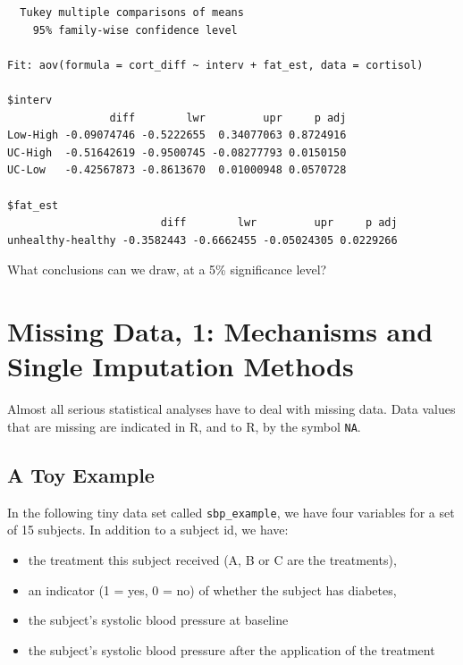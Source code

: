 \documentclass[]{book}
\providecommand{\tightlist}{%
  \setlength{\itemsep}{0pt}\setlength{\parskip}{0pt}}
\theoremstyle{definition}
\theoremstyle{definition}
\theoremstyle{definition}
\theoremstyle{remark}
\begin{document}
\begin{verbatim}
  Tukey multiple comparisons of means
    95% family-wise confidence level

Fit: aov(formula = cort_diff ~ interv + fat_est, data = cortisol)

$interv
                diff        lwr         upr     p adj
Low-High -0.09074746 -0.5222655  0.34077063 0.8724916
UC-High  -0.51642619 -0.9500745 -0.08277793 0.0150150
UC-Low   -0.42567873 -0.8613670  0.01000948 0.0570728

$fat_est
                        diff        lwr         upr     p adj
unhealthy-healthy -0.3582443 -0.6662455 -0.05024305 0.0229266
\end{verbatim}

What conclusions can we draw, at a 5\% significance level?

\chapter{Missing Data, 1: Mechanisms and Single Imputation
Methods}\label{missing-data-1-mechanisms-and-single-imputation-methods}

Almost all serious statistical analyses have to deal with missing data.
Data values that are missing are indicated in R, and to R, by the symbol
\texttt{NA}.

\section{A Toy Example}\label{a-toy-example}

In the following tiny data set called \texttt{sbp\_example}, we have
four variables for a set of 15 subjects. In addition to a subject id, we
have:

\begin{itemize}
\tightlist
\item
  the treatment this subject received (A, B or C are the treatments),
\item
  an indicator (1 = yes, 0 = no) of whether the subject has diabetes,
\item
  the subject's systolic blood pressure at baseline
\item
  the subject's systolic blood pressure after the application of the
  treatment
\end{itemize}
\end{document}
